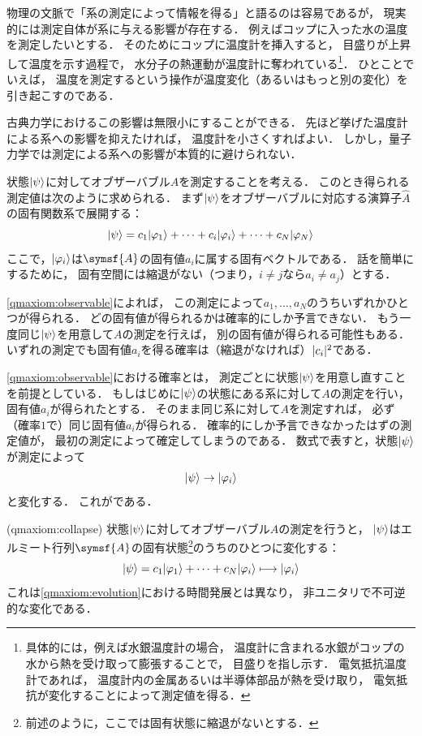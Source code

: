 \documentclass[
]{sotsu}
\begin{document}
物理の文脈で「系の測定によって情報を得る」と語るのは容易であるが，
現実的には測定自体が系に与える影響が存在する．
例えばコップに入った水の温度を測定したいとする．
そのためにコップに温度計を挿入すると，
目盛りが上昇して温度を示す過程で，
水分子の熱運動が温度計に奪われている\footnote{
    具体的には，例えば水銀温度計の場合，
    温度計に含まれる水銀がコップの水から熱を受け取って膨張することで，
    目盛りを指し示す．
    電気抵抗温度計であれば，
    温度計内の金属あるいは半導体部品が熱を受け取り，
    電気抵抗が変化することによって測定値を得る．
}．
ひとことでいえば，
温度を測定するという操作が温度変化（あるいはもっと別の変化）を引き起こすのである．

古典力学におけるこの影響は無限小にすることができる．
先ほど挙げた温度計による系への影響を抑えたければ，
温度計を小さくすればよい．
しかし，量子力学では測定による系への影響が本質的に避けられない．

状態$\ket{\psi}$に対してオブザーバブル$A$を測定することを考える．
このとき得られる測定値は次のように求められる．
まず$\ket{\psi}$をオブザーバブルに対応する演算子$\hat{A}$の固有関数系で展開する：
\begin{equation*}
    \ket{\psi} = c_1 \ket{\varphi_1} + \dots + c_i \ket{\varphi_i} + \dots + c_N \ket{\varphi_N}
\end{equation*}
ここで，$\ket{\varphi_i}$は$\symsf{A}$の固有値$a_i$に属する固有ベクトルである．
話を簡単にするために，
固有空間には縮退がない（つまり，$i \neq j$なら$a_i \neq a_j$）とする．

\cref{qmaxiom:observable}によれば，
この測定によって$a_1, \dots, a_N$のうちいずれかひとつが得られる．
どの固有値が得られるかは確率的にしか予言できない．
もう一度同じ$\ket{\psi}$を用意して$A$の測定を行えば，
別の固有値が得られる可能性もある．
いずれの測定でも固有値$a_i$を得る確率は（縮退がなければ）$\lvert c_i\rvert^2$である．

\cref{qmaxiom:observable}における確率とは，
測定ごとに状態$\ket{\psi}$を用意し直すことを前提としている．
もしはじめに$\ket{\psi}$の状態にある系に対して$A$の測定を行い，
固有値$a_i$が得られたとする．
そのまま同じ系に対して$A$を測定すれば，
必ず（確率$1$で）同じ固有値$a_i$が得られる．
確率的にしか予言できなかったはずの測定値が，
最初の測定によって確定してしまうのである．
数式で表すと，状態$\ket{\psi}$が測定によって
\begin{equation*}
    \ket{\psi} \to \ket{\varphi_i}
\end{equation*}
と変化する．
これがである．


\begin{qmaxiom}[波束の収縮](qmaxiom:collapse)
    状態$\ket{\psi}$に対してオブザーバブル$A$の測定を行うと，
    $\ket{\psi}$はエルミート行列$\symsf{A}$の固有状態\footnote{
        前述のように，ここでは固有状態に縮退がないとする．
    }のうちのひとつに変化する：
    \begin{equation*}
        \ket{\psi} 
        = c_1 \ket{\varphi_1} + \dotsb + c_N \ket{\varphi_i}
        \longmapsto \ket{\varphi_i}
    \end{equation*}
    これは\cref{qmaxiom:evolution}における時間発展とは異なり，
    非ユニタリで不可逆的な変化である．
\end{qmaxiom}
\end{document}

